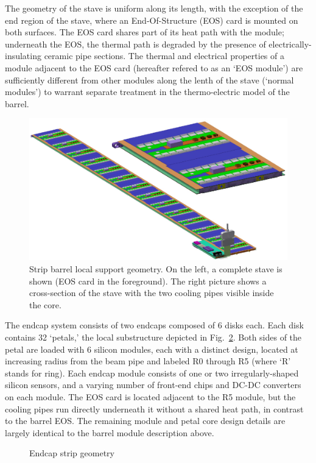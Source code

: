 The geometry of the stave is uniform along its length, with the exception of the end region of the stave, where an End-Of-Structure (EOS) card is mounted on both surfaces. The EOS card shares part of its heat path with the module; underneath the EOS, the thermal path is degraded by the presence of electrically-insulating ceramic pipe sections. The thermal and electrical properties of a module adjacent to the EOS card (hereafter refered to as an `EOS module') are sufficiently different from other modules along the lenth of the stave (`normal modules') to warrant separate treatment in the thermo-electric model of the barrel.

\begin{figure}[ht]
\centering
\includegraphics[width=0.8\linewidth]{figures/stave.pdf}
\caption{Strip barrel local support geometry. On the left, a complete stave is shown (EOS card in the foreground). The right picture shows a cross-section of the stave with the two cooling pipes visible inside the core. }
\label{fig:barrelgeometry}
\end{figure}

The endcap system consists of two endcaps composed of 6 disks each.
Each disk contains 32 `petals,' the local substructure depicted in Fig.~\ref{fig:endcapgeometry}.
Both sides of the petal are loaded with 6 silicon modules, each with a distinct design,
located at increasing radius from the beam pipe and labeled R0 through R5 (where `R' stands for ring).
Each endcap module consists of one
or two irregularly-shaped silicon sensors, and a varying number of front-end chips and DC-DC converters on each module.
The EOS card is located adjacent to the R5 module, but the
cooling pipes run directly underneath it without a shared heat path, in contrast to the barrel EOS.
The remaining module and petal core design details are largely identical to the barrel module description above.

\begin{figure}[ht]
\centering
\caption{Endcap strip geometry}
\label{fig:endcapgeometry}
\end{figure}

